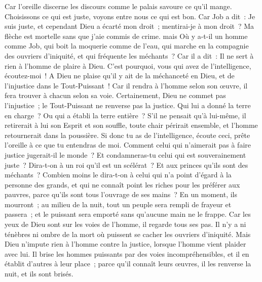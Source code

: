 \begin{multicols}{2}
Car l'oreille discerne les discours comme le palais savoure ce qu'il mange.
Choisissons ce qui est juste, voyons entre nous ce qui est bon.
Car Job a dit~: Je suis juste, et cependant Dieu a écarté mon droit~;
mentirai-je à mon droit~? Ma flèche est mortelle sans que j'aie commis de crime.
mais Où y a-t-il un homme comme Job, qui boit la moquerie comme de l'eau,
qui marche en la compagnie des ouvriers d'iniquité, et qui fréquente les méchants~? 
Car il a dit~: Il ne sert à rien à l'homme de plaire à Dieu.
 C'est pourquoi, vous qui avez de l'intelligence, écoutez-moi~! A Dieu ne plaise qu'il y ait de la méchanceté en Dieu, et de l'injustice dans le Tout-Puissant~!
Car il rendra à l'homme selon son œuvre, il fera trouver à chacun selon sa voie.
Certainement, Dieu ne commet pas l'injustice~; le Tout-Puissant ne renverse pas la justice.
Qui lui a donné la terre en charge~? Ou qui a établi la terre entière~?
S'il ne pensait qu'à lui-même, il retirerait à lui son Esprit et son souffle,
toute chair périrait ensemble, et l'homme retournerait dans la poussière.
Si donc tu as de l'intelligence, écoute ceci, prête l'oreille à ce que tu entendras de moi.
Comment celui qui n'aimerait pas à faire justice jugerait-il le monde~? Et condamneras-tu celui qui est souverainement juste~?
Dira-t-on à un roi qu'il est un scélérat~? Et aux princes qu'ils sont des méchants~?
Combien moins le dira-t-on à celui qui n'a point d'égard à la personne des grands, et qui ne connaît point les riches pour les préférer aux pauvres, parce qu'ils sont tous l'ouvrage de ses mains~?
En un moment, ils mourront~; au milieu de la nuit, tout un peuple sera rempli de frayeur et passera~; et le puissant sera emporté sans qu'aucune main ne le frappe.
Car les yeux de Dieu sont sur les voies de l'homme, il regarde tous ses pas.
Il n'y a ni ténèbres ni ombre de la mort où puissent se cacher les ouvriers d'iniquité.
Mais Dieu n'impute rien à l'homme contre la justice, lorsque l'homme vient plaider avec lui. 
Il brise les hommes puissants par des voies incompréhensibles, et il en établit d'autres à leur place~;
parce qu'il connaît leurs œuvres, il les renverse la nuit, et ils sont brisés. 

\end{multicols}
